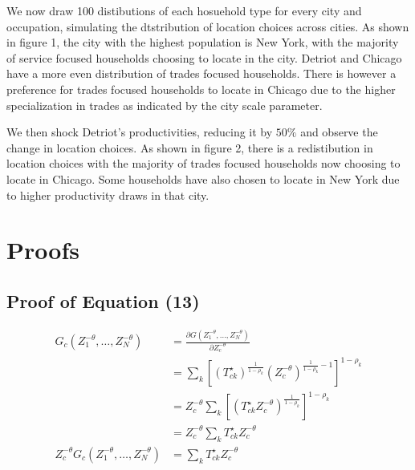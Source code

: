 \documentclass[10pt]{article}
\begin{document}
We now draw 100 distibutions of each hosuehold type for every city and occupation, simulating the dtstribution of location choices across cities. As shown in figure 1, the city with the highest population is New York, with the majority of service focused households choosing to locate in the city. Detriot and Chicago have a more even distribution of trades focused households. There is however a preference for trades focused households to locate in Chicago due to the higher specialization in trades as indicated by the city scale parameter.

We then shock Detriot's productivities, reducing it by $50\%$ and observe the change in location choices. As shown in figure 2, there is a redistibution in location choices with the majority of trades focused households now choosing to locate in Chicago. Some households have also chosen to locate in New York due to higher productivity draws in that city.

\newpage

\section{Proofs}

\subsection{Proof of Equation (13)}

\begin{align*}
    G_c (Z_1^{-\theta}, \dots, Z_N^{-\theta})               & = \frac{\partial G(Z_1^{-\theta}, \dots, Z_N^{-\theta})}{\partial Z_c^{-\theta}}                                 \\
                                                            & = \sum_{k}^{} [(T_{ck}^{\star} )^{\frac{1}{1 - \rho_k}} (Z_c^{-\theta})^{\frac{1}{1 - \rho_k} - 1}]^{1 - \rho_k} \\
                                                            & = Z_c^{-\theta} \sum_{k}^{} [(T_{ck}^{\star} Z_c^{-\theta} )^{\frac{1}{1 - \rho_k}}]^{1 - \rho_k}                \\
                                                            & = Z_c^{-\theta} \sum_{k}^{} T_{ck}^{\star} Z_c^{-\theta}                                                         \\
    Z_c^{-\theta} G_c (Z_1^{-\theta}, \dots, Z_N^{-\theta}) & = \sum_{k}^{} T_{ck}^{\star}  Z_c^{-\theta}
\end{align*}
\end{document}
